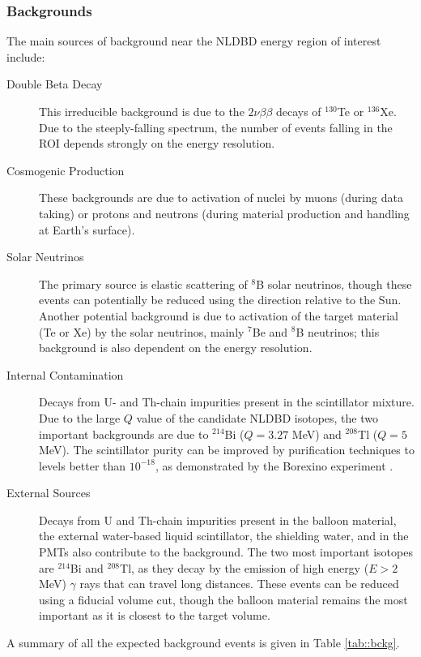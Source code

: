 \subsubsection{Backgrounds}
The main sources of background near the NLDBD energy region of interest
include:
\begin{description}
\item[Double Beta Decay] This irreducible background is due to the
$2\nu\beta\beta$ decays of $^{130}$Te or $^{136}$Xe. Due to the steeply-falling
spectrum, the number of events falling in the ROI depends strongly on the
energy resolution.
\item[Cosmogenic Production] These backgrounds are due to activation of nuclei
by muons (during data taking) or protons and neutrons (during material
production and handling at Earth's surface).
\item[Solar Neutrinos] The primary source is elastic scattering of $^{8}$B
solar neutrinos, though these events can potentially be reduced using the
direction relative to the Sun. Another potential background is due to
activation of the target material (Te or Xe) by the solar neutrinos,
mainly $^{7}$Be and $^{8}$B neutrinos; this background is also dependent
on the energy resolution.
\item[Internal Contamination] Decays from U- and Th-chain impurities
present in the scintillator mixture. Due to the large $Q$ value of the
candidate NLDBD isotopes, the two important backgrounds are due to
$^{214}$Bi ($Q=3.27$ MeV) and $^{208}$Tl ($Q=5$ MeV). The scintillator
purity can be improved by purification techniques to levels better than
$10^{-18}$, as demonstrated by the Borexino experiment \cite{bxo16}.
\item[External Sources] Decays from U and Th-chain impurities present
in the balloon material, the external water-based liquid scintillator, the
shielding water, and in the PMTs also contribute to the background. The
two most important isotopes are $^{214}$Bi and $^{208}$Tl, as they decay by
the emission of high energy ($E>2$ MeV) $\gamma$ rays that can travel long
distances. These events can be reduced using a fiducial volume cut, though the
balloon material remains the most important as it is closest to the target
volume.
\end{description}
A summary of all the expected background events is given in Table
\ref{tab::bckg}.


